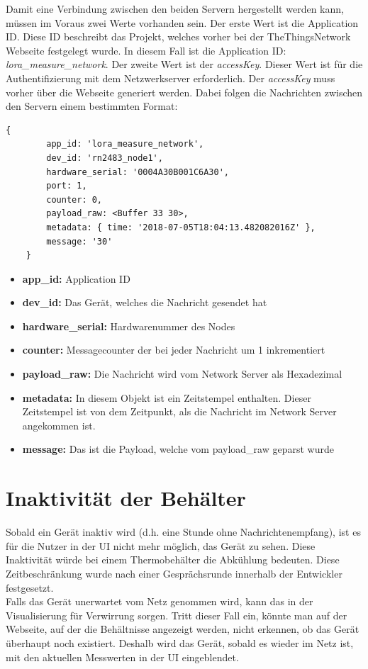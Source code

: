 \noindent
Damit eine Verbindung zwischen den beiden Servern hergestellt werden kann, müssen im Voraus zwei Werte vorhanden sein. Der erste Wert ist die Application ID. Diese ID beschreibt das Projekt, welches vorher bei der TheThingsNetwork Webseite festgelegt wurde. In diesem Fall ist die Application ID: \textit{lora\_measure\_network}. Der zweite Wert ist der \textit{accessKey}. Dieser Wert ist für die Authentifizierung mit dem Netzwerkserver erforderlich. Der \textit{accessKey} muss vorher über die Webseite generiert werden. Dabei folgen die Nachrichten zwischen den Servern einem bestimmten Format:\\


\begin{lstlisting}[caption=Einkommender Messdatensatz,label=lst:payload]
    { 
        app_id: 'lora_measure_network',
        dev_id: 'rn2483_node1',
        hardware_serial: '0004A30B001C6A30',
        port: 1,
        counter: 0,
        payload_raw: <Buffer 33 30>,
        metadata: { time: '2018-07-05T18:04:13.482082016Z' },
        message: '30' 
    }
\end{lstlisting}
\begin{itemize}
    \item \textbf{app\_id:} Application ID
    \item \textbf{dev\_id:} Das Gerät, welches die Nachricht gesendet hat 
    \item \textbf{hardware\_serial:} Hardwarenummer des Nodes
    \item \textbf{counter:} Messagecounter der bei jeder Nachricht um 1 inkrementiert
    \item \textbf{payload\_raw:} Die Nachricht wird vom Network Server als Hexadezimal
    \item \textbf{metadata:} In diesem Objekt ist ein Zeitstempel enthalten. Dieser Zeitstempel ist von dem Zeitpunkt, als die Nachricht im Network Server angekommen ist.
    \item \textbf{message:} Das ist die Payload, welche vom payload\_raw geparst wurde 
\end{itemize} 
\newpage
\section{Inaktivität der Behälter}
Sobald ein Gerät inaktiv wird (d.h. eine Stunde ohne Nachrichtenempfang), ist es für die Nutzer in der UI nicht mehr möglich, das Gerät zu sehen. Diese Inaktivität würde bei einem Thermobehälter die Abkühlung bedeuten. Diese Zeitbeschränkung wurde nach einer Gesprächsrunde innerhalb der Entwickler festgesetzt.\\
Falls das Gerät unerwartet vom Netz genommen wird, kann das in der Visualisierung für Verwirrung sorgen. Tritt dieser Fall ein, könnte man auf der Webseite, auf der die Behältnisse angezeigt werden, nicht erkennen, ob das Gerät überhaupt noch existiert. Deshalb wird das Gerät, sobald es wieder im Netz ist, mit den aktuellen Messwerten in der UI eingeblendet. 

